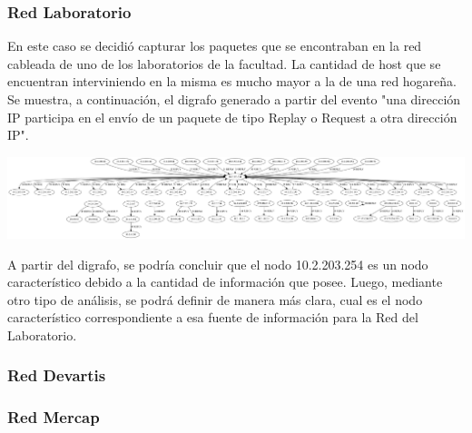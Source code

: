 \subsubsection{Red Laboratorio}
En este caso se decidió capturar los paquetes que se encontraban en la red cableada de uno de los laboratorios de la facultad. La cantidad de host que se encuentran interviniendo en la misma es mucho mayor a la de una red hogareña. Se muestra, a continuación, el digrafo generado a partir del evento "una dirección IP participa en el envío de un paquete de tipo Replay o Request a otra dirección IP". 


\centerline{\includegraphics[angle=90, scale=0.3]{./graficos/grafos-arp/grafo_labo5.png}}

A partir del digrafo, se podría concluir que el nodo 10.2.203.254 es un nodo característico debido a la cantidad de información que posee. Luego, mediante otro tipo de análisis, se podrá definir de manera más clara, cual es el nodo característico correspondiente a esa fuente de información para la Red del Laboratorio. 


\subsubsection{Red Devartis}


\subsubsection{Red Mercap}
